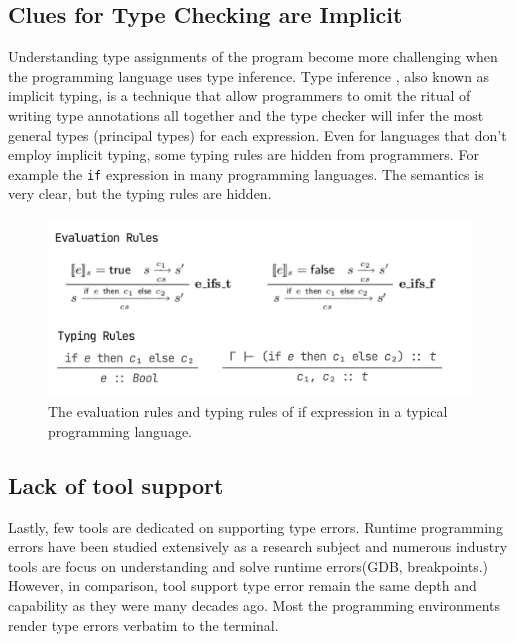 \subsection{Clues for Type Checking are Implicit}
Understanding type assignments of the program become more challenging when the programming language uses type inference.  Type inference \cite{Damas1982-sc},  also known as implicit typing,  is a technique that allow programmers to omit the ritual of writing type annotations all together and the type checker will infer the most general types (principal types) for each expression. Even for languages that don't employ implicit typing, some typing rules are hidden from programmers.
For example the \texttt{if} expression in many programming languages. The semantics is very clear, but the typing rules are hidden.

\begin{figure}[hbt]
  \includegraphics[width=\linewidth]{IfRules.png}
  \caption{
   The evaluation rules and typing rules of if expression in a typical programming language.
    }
\end{figure}


\subsection{Lack of tool support}
Lastly, few tools are dedicated on supporting type errors. Runtime programming errors have been studied extensively as a research subject and numerous industry tools are focus on understanding and solve runtime errors(GDB, breakpoints.) However, in comparison, tool support type error  remain the same depth and capability as they were many decades ago. Most the programming environments render type errors verbatim to the terminal.   


